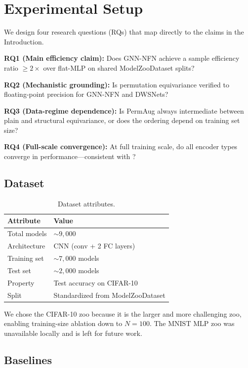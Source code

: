 \section{Experimental Setup}
\label{sec:experiments}

We design four research questions (RQs) that map directly to the claims in the Introduction.

\textbf{RQ1 (Main efficiency claim):} Does GNN-NFN achieve a sample efficiency ratio $\geq 2{\times}$ over flat-MLP on shared ModelZooDataset splits?

\textbf{RQ2 (Mechanistic grounding):} Is permutation equivariance verified to floating-point precision for GNN-NFN and DWSNets?

\textbf{RQ3 (Data-regime dependence):} Is PermAug always intermediate between plain and structural equivariance, or does the ordering depend on training set size?

\textbf{RQ4 (Full-scale convergence):} At full training scale, do all encoder types converge in performance---consistent with \citet{Dayan2026Expressive}?

\subsection{Dataset}

\begin{table}[h]
\centering
\caption{Dataset attributes.}
\label{tab:dataset}
\begin{tabular}{ll}
\toprule
Attribute & Value \\
\midrule
Total models & ${\sim}9{,}000$ \\
Architecture & CNN (conv + 2 FC layers) \\
Training set & ${\sim}7{,}000$ models \\
Test set & ${\sim}2{,}000$ models \\
Property & Test accuracy on CIFAR-10 \\
Split & Standardized from ModelZooDataset \\
\bottomrule
\end{tabular}
\end{table}

We chose the CIFAR-10 zoo because it is the larger and more challenging zoo, enabling training-size ablation down to $N{=}100$. The MNIST MLP zoo was unavailable locally and is left for future work.

\subsection{Baselines}

